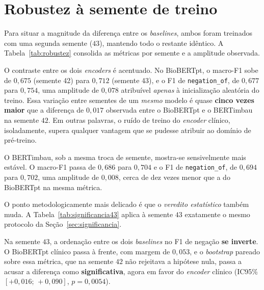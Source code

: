 \section{Robustez à semente de treino}
\label{sec:robustez}

Para situar a magnitude da diferença entre os \emph{baselines}, ambos foram
treinados com uma segunda semente ($43$), mantendo todo o restante idêntico. A
Tabela~\ref{tab:robustez} consolida as métricas por semente e a amplitude
observada.



O contraste entre os dois \emph{encoders} é acentuado. No BioBERTpt, o macro-F1
sobe de $0{,}675$ (semente 42) para $0{,}712$ (semente 43), e o F1 de
\texttt{negation\_of}, de $0{,}677$ para $0{,}754$, uma amplitude de $0{,}078$
atribuível \emph{apenas} à inicialização aleatória do treino. Essa variação entre
sementes de um \emph{mesmo} modelo é quase \textbf{cinco vezes maior} que a
diferença de $0{,}017$ observada entre o BioBERTpt e o BERTimbau na semente $42$.
Em outras palavras, o ruído de treino do \emph{encoder} clínico, isoladamente,
supera qualquer vantagem que se pudesse atribuir ao domínio de pré-treino.

O BERTimbau, sob a mesma troca de semente, mostra-se sensivelmente mais estável. O
macro-F1 passa de $0{,}686$ para $0{,}704$ e o F1 de \texttt{negation\_of}, de
$0{,}694$ para $0{,}702$, uma amplitude de $0{,}008$, cerca de dez vezes menor
que a do BioBERTpt na mesma métrica.

O ponto metodologicamente mais delicado é que o \emph{veredito estatístico} também
muda. A Tabela~\ref{tab:significancia43} aplica à semente $43$ exatamente o mesmo
protocolo da Seção~\ref{sec:significancia}.



Na semente $43$, a ordenação entre os dois \emph{baselines} no F1 de negação
\textbf{se inverte}. O BioBERTpt clínico passa à frente, com margem de $0{,}053$, e
o \emph{bootstrap} pareado sobre essa métrica, que na semente $42$ não rejeitava
a hipótese nula, passa a acusar a diferença como \textbf{significativa}, agora
em favor do \emph{encoder} clínico (IC95\% $[+0{,}016;\,+0{,}090]$, $p=0{,}0054$).


